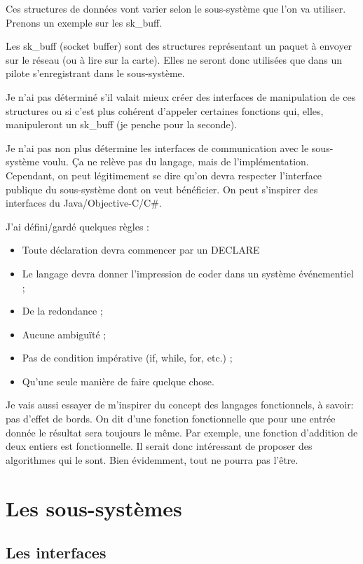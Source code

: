 \documentclass[french]{rtxreport}
\begin{document}
Ces structures de données vont varier selon le sous-système que l’on va utiliser. Prenons un exemple sur les sk\_buff.

Les sk\_buff (socket buffer) sont des structures représentant un paquet à envoyer sur le réseau (ou à lire sur la carte). Elles ne seront donc utilisées que dans un pilote s’enregistrant dans le sous-système.

Je n’ai pas déterminé s’il valait mieux créer des interfaces de manipulation de ces structures ou si c’est plus cohérent d’appeler certaines fonctions qui, elles, manipuleront un sk\_buff (je penche pour la seconde).

Je n’ai pas non plus détermine les interfaces de communication avec le sous-système voulu. Ça ne relève pas du langage, mais de l’implémentation. Cependant, on peut légitimement se dire qu’on devra respecter l’interface publique du sous-système dont on veut bénéficier. On peut s’inspirer des interfaces du Java/Objective-C/C\#.


J’ai défini/gardé quelques règles : 
\begin{itemize}
	\item Toute déclaration devra commencer par un DECLARE 
	\item Le langage devra donner l’impression de coder dans un système événementiel ; 
	\item De la redondance ; 
	\item Aucune ambiguïté ;
	\item Pas de condition impérative (if, while, for, etc.) ; 
	\item Qu’une seule manière de faire quelque chose.
\end{itemize}

Je vais aussi essayer de m’inspirer du concept des langages fonctionnels, à savoir: pas d’effet de bords. On dit d’une fonction fonctionnelle que pour une entrée donnée le résultat sera toujours le même. Par exemple, une fonction d’addition de deux entiers est fonctionnelle. Il serait donc intéressant de proposer des algorithmes qui le sont. Bien évidemment, tout ne pourra pas l’être.

\chapter{Les sous-systèmes}

\section{Les interfaces}
\end{document}
